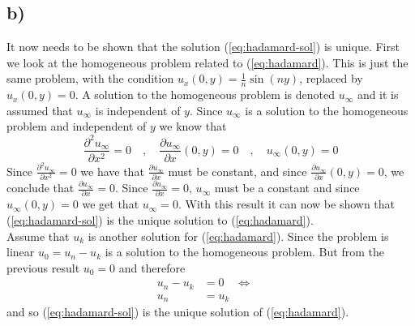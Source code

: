 \documentclass[11pt]{article}
\newcommand\myimp{\quad\Leftrightarrow\quad}
\newcommand\uinf{u_{\infty}}
\begin{document}
\subsection*{b)}
It now needs to be shown that the solution (\ref{eq:hadamard-sol}) is unique. First we look at the homogeneous problem related to (\ref{eq:hadamard}). This is just the same problem, with the condition $u_x(0,y)=\frac{1}{n}\sin(ny)$, replaced by $u_x(0,y)=0$. A solution to the homogeneous problem is denoted $\uinf$ and it is assumed that $\uinf$ is independent of $y$. Since $\uinf$ is a solution to the homogeneous problem and independent of $y$ we know that
\begin{equation*}
    \frac{\partial^2 \uinf}{\partial x^2} = 0 \quad,\quad \frac{\partial \uinf}{\partial x}(0,y) = 0 \quad,\quad \uinf(0,y) = 0
\end{equation*}
Since $\frac{\partial^2 \uinf}{\partial x^2} = 0$ we have that $\frac{\partial \uinf}{\partial x}$ must be constant, and since $\frac{\partial \uinf}{\partial x}(0,y) = 0$, we conclude that $\frac{\partial \uinf}{\partial x}=0$. Since $\frac{\partial \uinf}{\partial x}=0$, $\uinf$ must be a constant and since $\uinf(0,y)=0$ we get that $\uinf = 0$. With this result it can now be shown that (\ref{eq:hadamard-sol}) is the unique solution to (\ref{eq:hadamard}). \\
Assume that $u_{k}$ is another solution for (\ref{eq:hadamard}). Since the problem is linear $u_0=u_n-u_{k}$ is a solution to the homogeneous problem. But from the previous result $u_0=0$ and therefore
\begin{align*}
    u_n - u_{k} &= 0 \myimp\\
    u_n &= u_{k}
\end{align*}
and so (\ref{eq:hadamard-sol}) is the unique solution of (\ref{eq:hadamard}).
\end{document}
